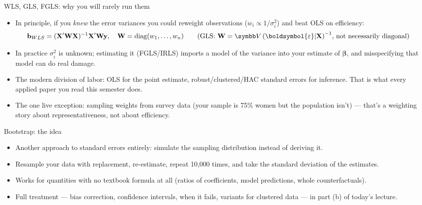 \documentclass[aspectratio=169,11pt]{beamer}
\begin{document}
\begin{frame}{WLS, GLS, FGLS: why you will rarely run them}
\begin{itemize}
	\item In principle, if you \emph{knew} the error variances you could reweight
	observations ($w_i \propto 1/\sigma_i^2$) and beat OLS on efficiency:\[
	{\bf b}_{WLS} = ({\bf X}' {\bf W} {\bf X})^{-1} {\bf X}' {\bf W} {\bf y},
	\quad {\bf W} = \operatorname{diag}(w_1,\ldots,w_n)
	\qquad \text{(GLS: ${\bf W} = \Var\left(\boldsymbol{\varepsilon}|{\bf X}\right)^{-1}$, not necessarily diagonal)}
	\]

	\item In practice $\sigma_i^2$ is unknown; estimating it (FGLS/IRLS) imports a
	model of the variance into your estimate of $\boldsymbol{\beta}$, and misspecifying that model
	can do real damage.

	\item The modern division of labor: \alert{OLS for the point estimate,
	robust/clustered/HAC standard errors for inference}. That is what every applied
	paper you read this semester does.

	\item The one live exception: \alert{sampling weights} from survey data
	(your sample is 75\% women but the population isn't) --- that's a weighting
	story about representativeness, not about efficiency.
\end{itemize}
\end{frame}



\begin{frame}{Bootstrap: the idea}
\begin{itemize}
	\item Another approach to standard errors entirely: \alert{simulate the sampling
	distribution} instead of deriving it.

	\item Resample your data with replacement, re-estimate, repeat 10{,}000 times,
	and take the standard deviation of the estimates.

	\item Works for quantities with no textbook formula at all (ratios of
	coefficients, model predictions, whole counterfactuals).

	\item Full treatment --- bias correction, confidence intervals, when it fails,
	variants for clustered data --- in part (b) of today's lecture.
\end{itemize}
\end{frame}
\end{document}
